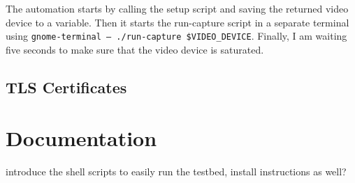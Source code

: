 The automation starts by calling the setup script and saving the returned video device to a variable. Then it starts the run-capture script in a separate terminal using \texttt{gnome-terminal -- ./run-capture \$VIDEO\_DEVICE}. Finally, I am waiting five seconds to make sure that the video device is saturated. 

\subsection{TLS Certificates}


\section{Documentation\label{sec:docu}}

introduce the shell scripts to easily run the testbed, install instructions as well?
